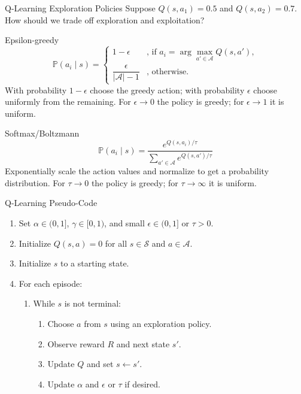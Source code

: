 \documentclass[aspectratio=169]{beamer}%
\begin{document}
\begin{frame}{Q-Learning Exploration Policies}
Suppose $Q(s,a_1)=0.5$ and $Q(s,a_2)=0.7$. How should we trade off exploration and exploitation?

\begin{block}{Epsilon-greedy}
\[
\mathbb{P}(a_i\mid s)=
\begin{cases}
1-\epsilon & \text{, if } a_i=\arg\max_{a'\in\mathcal{A}} Q(s,a'),\\
\dfrac{\epsilon}{|\mathcal{A}|-1} & \text{, otherwise.}
\end{cases}
\]
With probability $1-\epsilon$ choose the greedy action; with probability $\epsilon$ choose uniformly from the remaining. For $\epsilon\to0$ the policy is greedy; for $\epsilon\to1$ it is uniform.
\end{block}

\begin{block}{Softmax/Boltzmann}
\[
\mathbb{P}(a_i\mid s)=\frac{e^{Q(s,a_i)/\tau}}{\sum_{a'\in\mathcal{A}} e^{Q(s,a')/\tau}}
\]
Exponentially scale the action values and normalize to get a probability distribution. For $\tau\to0$ the policy is greedy; for $\tau\to\infty$ it is uniform.
\end{block}
\end{frame}

\begin{frame}{Q-Learning Pseudo-Code}
\begin{enumerate}
    \item Set $\alpha\in(0,1]$, $\gamma\in[0,1)$, and small $\epsilon\in(0,1]$ or $\tau>0$.
    \item Initialize $Q(s,a)=0$ for all $s\in \mathcal{S}$ and $a\in \mathcal{A}$.
    \item Initialize $s$ to a starting state.
    \item For each episode:
    \begin{enumerate}
        \item While $s$ is not terminal:
        \begin{enumerate}
            \item Choose $a$ from $s$ using an exploration policy.
            \item Observe reward $R$ and next state $s'$.
            \item Update $Q$ and set $s\leftarrow s'$.
            \item Update $\alpha$ and $\epsilon$ or $\tau$ if desired.
        \end{enumerate}
    \end{enumerate}
\end{enumerate}
\end{frame}
\end{document}
